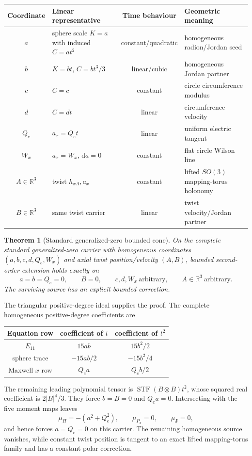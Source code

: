 \documentclass[11pt]{article}
\newtheorem{theorem}{Theorem}[section]
\theoremstyle{definition}
\theoremstyle{remark}
\newcommand{\R}{\mathbb R}
\newcommand{\dd}{\mathrm d}
\begin{document}
\begin{center}
\small
\begin{tabularx}{0.98\textwidth}{@{}c Y c Y@{}}
\toprule
Coordinate & Linear representative & Time behaviour & Geometric meaning\\
\midrule
$a$ & sphere scale $K=a$ with induced $C=at^2$ & constant/quadratic &
homogeneous radion/Jordan seed\\
$b$ & $K=bt$, $C=bt^3/3$ & linear/cubic & homogeneous Jordan partner\\
$c$ & $C=c$ & constant & circle circumference modulus\\
$d$ & $C=dt$ & linear & circumference velocity\\
$Q_e$ & $a_x=Q_et$ & linear & uniform electric tangent\\
$W_x$ & $a_x=W_x$, $\dd a=0$ & constant & flat circle Wilson line\\
$A\in\R^3$ & twist $h_{xA},a_x$ & constant & lifted $SO(3)$ mapping-torus holonomy\\
$B\in\R^3$ & same twist carrier & linear & twist velocity/Jordan partner\\
\bottomrule
\end{tabularx}
\end{center}

\begin{theorem}[Standard generalized-zero bounded cone]
\label{thm:standard-global-bounded}
On the complete standard generalized-zero carrier with homogeneous
coordinates \((a,b,c,d,Q_e,W_x)\) and axial twist position/velocity
\((A,B)\), bounded second-order extension holds exactly on
\begin{equation}
 a=b=Q_e=0,\qquad B=0,\qquad
 c,d,W_x\ \text{arbitrary},\qquad A\in\R^3\ \text{arbitrary}.
\end{equation}
The surviving source has an explicit bounded correction.
\end{theorem}

The triangular positive-degree ideal supplies the proof.  The complete
homogeneous positive-degree coefficients are
\begin{center}
\begin{tabular}{@{}c cc@{}}
\toprule
Equation row & coefficient of $t$ & coefficient of $t^2$\\
\midrule
$E_{11}$ & $15ab$ & $15b^2/2$\\
sphere trace & $-15ab/2$ & $-15b^2/4$\\
Maxwell $x$ row & $Q_ea$ & $Q_eb/2$\\
\bottomrule
\end{tabular}
\end{center}
The remaining leading polynomial tensor is
\(\operatorname{STF}(B\otimes B)t^2\), whose squared real coefficient is
\(2|B|^4/3\).
They force \(b=B=0\) and \(Q_ea=0\).  Intersecting with the five moment maps
leaves
\[
 \mu_H=-(a^2+Q_e^2),\qquad \mu_{P_x}=0,\qquad\mu_{\mathbf J}=0,
\]
and hence forces \(a=Q_e=0\) on this carrier.  The remaining homogeneous
source vanishes, while constant twist position is tangent to an exact lifted
mapping-torus family and has a constant polar correction.
\end{document}
